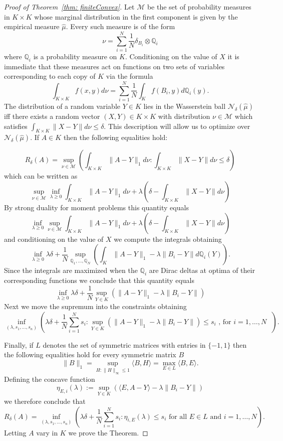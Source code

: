 \documentclass[12pt]{amsart}
\theoremstyle{remark}
\begin{document}
\begin{proof}[Proof of Theorem~\ref{thm: finiteConvex}]


Let $\mathcal{M}$ be the set of probability measures in $K\times K$ whose marginal distribution in the first component is given by the empirical measure $\hat{\mu}$. Every such measure is of the form 
\[\nu = \sum_{i=1}^N \frac{1}{N} \delta_{B_i}\otimes \mathbb{Q}_i\]
where $\mathbb{Q}_i$ is a probability measure on $K$. Conditioning on the value of $X$ it is immediate that these measures act on functions on two sets of variables corresponding to each copy of $K$ via the formula
\[\int_{K\times K} f(x,y) d\nu = \sum_{i=1}^ N \frac{1}{N} \int_K f(B_i,y)d\mathbb{Q}_i(y).\]
The distribution of a random variable $Y\in K$ lies in the Wasserstein ball $\mathcal{N}_{\delta}(\hat{\mu})$ iff there exists a random vector $(X,Y)\in K\times K$ with distribution $\nu\in \mathcal{M}$ which satisfies $\int_{K\times K} \|X-Y\|d\nu\leq \delta$. This description will allow us to optimize over  $\mathcal{N}_{\delta}(\hat{\mu})$.
If $A\in K$ then the following equalities hold:

\[R_{\delta}(A)=\sup_{\nu\in\mathcal{M}}\left( \int_{K\times K}\|A-Y\|_1d\nu :  \int_{K\times K} \|X-Y\|d\nu\leq \delta\right)\]
which can be written as
\[\sup_{\nu\in \mathcal{M}} \inf_{\lambda\geq 0} \int_{K\times K}\|A-Y\|_1d\nu+\lambda\left(\delta-\int_{K\times K} \|X-Y\|d\nu\right)\]
By strong duality for moment problems this quantity equals
\[\inf_{\lambda\geq 0} \sup_{\nu\in \mathcal{M}}  \int_{K\times K}\|A-Y\|_1d\nu+\lambda\left(\delta-\int_{K\times K} \|X-Y\|d\nu\right)\]
and conditioning on the value of $X$ we compute the integrals obtaining
\[\inf_{\lambda\geq 0} \lambda\delta +\frac{1}{N}\sup_{\mathbb{Q}_1,\dots, \mathbb{Q}_N}\left( \int_K \|A-Y\|_1-\lambda\|B_i-Y\|  d\mathbb{Q}_i(Y)\right).\]
Since the integrals are maximized when the $\mathbb{Q}_i$ are Dirac deltas at optima of their corresponding functions we conclude that this quantity equals
\[\inf_{\lambda\geq 0} \lambda\delta + \frac{1}{N} \sup_{Y\in K} \left(\|A-Y\|_1-\lambda\|B_i-Y\|\right)\]
Next we move the supremum into the constraints obtaining
\[ \inf_{(\lambda,s_1,\dots,s_n)}\left( \lambda\delta +\frac{1}{N}\sum_{i=1}^N s_i: \sup_{Y\in K}\left(\|A-Y\|_1-\lambda\|B_i-Y\|\right)\leq s_i\text{ , for $i=1,\dots, N$ }\right).\]

Finally, if $L$ denotes the set of symmetric matrices with entries in $\{-1,1\}$ then the following equalities hold for every symmetric matrix $B$ 
\[\|B\|_1=\sup_{H:\|H\|_{\infty}\leq 1} \langle B,H\rangle = \max_{E\in L}\langle B,E\rangle.\]
Defining the concave function
\[\eta_{E, i}(\lambda):= \sup_{Y\in K} \left(\langle E, A-Y\rangle -\lambda \|B_i-Y\|\right)\]
we therefore conclude that
\[R_{\delta}(A)=\inf_{(\lambda,s_1,\dots,s_n)}\left(\lambda\delta +\frac{1}{N}\sum_{i=1}^N s_i: \eta_{i,E}(\lambda)\leq s_i\text{ for all $E\in L$ and $i=1,\dots, N$}\right).\]
Letting $A$ vary in $K$ we prove the Theorem.
\end{proof}
\end{document}

